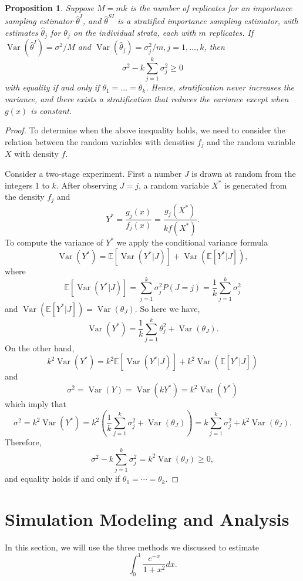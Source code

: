 \documentclass[11pt]{article}
\newtheorem{proposition}{Proposition}
\begin{document}
\begin{proposition}
Suppose $M = mk$ is the number of replicates for an importance sampling estimator $\widehat{\theta}^{I}$, and $\widehat{\theta}^{SI}$ is a stratified importance sampling estimator, with estimates $\widehat{\theta}_{j}$ for $\theta_j$ on the individual strata, each with $m$ replicates. If $\operatorname{Var}\left(\widehat{\theta}^{I}\right)=\sigma^2/M$ and $\operatorname{Var}\left(\widehat{\theta}_{j}\right)=\sigma_j^2/m, j=1,\ldots,k$, then
\[
\sigma^2-k\sum_{j=1}^k \sigma_j^2\geq 0
\]
with equality if and only if $\theta_1=\dots=\theta_k$. Hence, stratification never increases the variance, and there exists a stratification that reduces the variance except when $g(x)$ is constant.
\end{proposition}
\begin{proof}
To determine when the above inequality holds, we need to consider the relation between the random variables with densities $f_j$ and the random variable $X$ with density $f$.

Consider a two-stage experiment. First a number $J$ is drawn at random from the integers 1 to $k$. After observing $J=j$, a random variable $X^*$ is generated from the density $f_j$ and
\[
Y^*=\frac{g_j(x)}{f_j(x)}=\frac{g_j(X^*)}{kf(X^*)}.
\]
To compute the variance of $Y^*$ we apply the conditional variance formula \[
\operatorname{Var}(Y^*)=\mathbb{E}[\operatorname{Var}(Y^*|J)]+\operatorname{Var}(\mathbb{E}[Y^*|J]),
\]
where
\[
\mathbb{E}[\operatorname{Var}(Y^*|J)]=\sum_{j=1}^k\sigma_j^2P(J=j)=\frac{1}{k}\sum_{j=1}^k\sigma_j^2
\]
and $\operatorname{Var}(\mathbb{E}[Y^*|J])=\operatorname{Var}(\theta_J).$ So here we have,
\[
\operatorname{Var}(Y^*)=\frac{1}{k}\sum_{j=1}^k\theta_j^2+\operatorname{Var}(\theta_J).
\]
On the other hand, 
\[
k^2\operatorname{Var}(Y^*)=k^2\mathbb{E}[\operatorname{Var}(Y^*|J)]+k^2\operatorname{Var}(\mathbb{E}[Y^*|J])
\]
and 
\[
\sigma^2=\operatorname{Var}(Y)=\operatorname{Var}(kY^*)=k^2\operatorname{Var}(Y^*)
\]
which imply that
\[
\sigma^2=k^2\operatorname{Var}(Y^*)=k^2\left(\frac{1}{k}\sum_{j=1}^k\sigma_j^2+\operatorname{Var}(\theta_J)\right)=k\sum_{j=1}^k\sigma_j^2+k^2\operatorname{Var}(\theta_J).
\]
Therefore,
\[
\sigma^2-k\sum_{j=1}^k\sigma_j^2=k^2\operatorname{Var}(\theta_J)\geq0,
\]
and equality holds if and only if $\theta_1=\cdots=\theta_k$.
\end{proof}

\section{Simulation Modeling and Analysis}
In this section, we will use the three methods we discussed to estimate
\[
\int_0^1 \frac{e^{-x}}{1+x^2}dx.
\]
\end{document}
